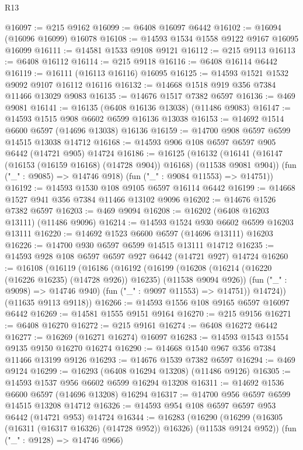 \begin{lexlean}{R13}
\begin{coremodule}
@16097 := @215 @9162
@16099 := @6408 @16097 @6442
@16102 := @16094 (@16096 @16099) @16078
@16108 := @14593 @1534 @1558 @9122 @9167 @16095 @16099
@16111 := @14581 @1533 @9108 @9121
@16112 := @215 @9113
@16113 := @6408 @16112
@16114 := @215 @9118
@16116 := @6408 @16114 @6442
@16119 := @16111 (@16113 @16116) @16095
@16125 := @14593 @1521 @1532 @9092 @9107 @16112 @16116
@16132 := @14668 @1518 @919 @356 @7384 @11466 @13029 @9083
@16135 := @14676 @1517 @7382 @6597
@16136 := @469 @9081
@16141 := @16135 (@6408 @16136 @13038) (@11486 @9083)
@16147 := @14593 @1515 @908 @6602 @6599 @16136 @13038
@16153 := @14692 @1514 @6600 @6597 (@14696 @13038) @16136
@16159 := @14700 @908 @6597 @6599 @14515 @13038 @14712
@16168 := @14593 @906 @108 @6597 @6597 @905 @6442 (@14721 @905) @14724
@16186 := @16125
    (@16132
      (@16141 (@16147 (@16153 (@16159 @16168) (@14728 @904)) @16168) (@11538 @9081 @904))
      (fun ("_" : @9085) => @14746 @918)
      (fun ("_" : @9084 @11553) => @14751))
@16192 := @14593 @1530 @108 @9105 @6597 @16114 @6442
@16199 := @14668 @1527 @941 @356 @7384 @11466 @13102 @9096
@16202 := @14676 @1526 @7382 @6597
@16203 := @469 @9094
@16208 := @16202 (@6408 @16203 @13111) (@11486 @9096)
@16214 := @14593 @1524 @930 @6602 @6599 @16203 @13111
@16220 := @14692 @1523 @6600 @6597 (@14696 @13111) @16203
@16226 := @14700 @930 @6597 @6599 @14515 @13111 @14712
@16235 := @14593 @928 @108 @6597 @6597 @927 @6442 (@14721 @927) @14724
@16260 := @16108
    (@16119
      (@16186
        (@16192
          (@16199
            (@16208 (@16214 (@16220 (@16226 @16235) (@14728 @926)) @16235) (@11538 @9094 @926))
            (fun ("_" : @9098) => @14746 @940)
            (fun ("_" : @9097 @11553) => @14751))
          @14724))
      (@11635 @9113 @9118))
@16266 := @14593 @1556 @108 @9165 @6597 @16097 @6442
@16269 := @14581 @1555 @9151 @9164
@16270 := @215 @9156
@16271 := @6408 @16270
@16272 := @215 @9161
@16274 := @6408 @16272 @6442
@16277 := @16269 (@16271 @16274) @16097
@16283 := @14593 @1543 @1554 @9135 @9150 @16270 @16274
@16290 := @14668 @1540 @967 @356 @7384 @11466 @13199 @9126
@16293 := @14676 @1539 @7382 @6597
@16294 := @469 @9124
@16299 := @16293 (@6408 @16294 @13208) (@11486 @9126)
@16305 := @14593 @1537 @956 @6602 @6599 @16294 @13208
@16311 := @14692 @1536 @6600 @6597 (@14696 @13208) @16294
@16317 := @14700 @956 @6597 @6599 @14515 @13208 @14712
@16326 := @14593 @954 @108 @6597 @6597 @953 @6442 (@14721 @953) @14724
@16344 := @16283
    (@16290
      (@16299 (@16305 (@16311 (@16317 @16326) (@14728 @952)) @16326) (@11538 @9124 @952))
      (fun ("_" : @9128) => @14746 @966)

\end{coremodule}
\end{lexlean}
